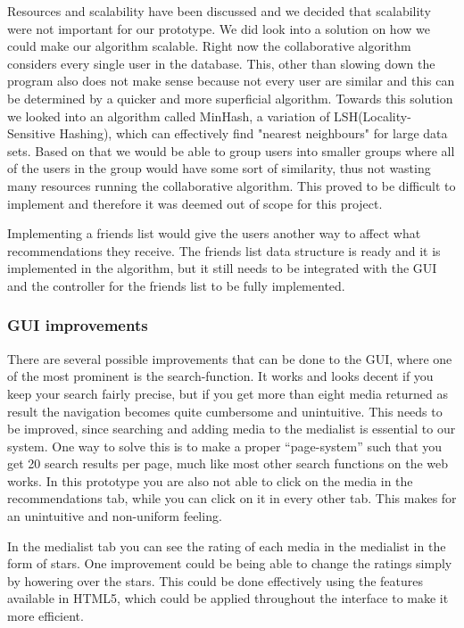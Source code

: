 Resources and scalability have been discussed and we decided that scalability were not important for our prototype. We did look into a solution on how we could make our algorithm scalable. Right now the collaborative algorithm considers every single user in the database. This, other than slowing down the program also does not make sense because not every user are similar and this can be determined by a quicker and more superficial algorithm. Towards this solution we looked into an algorithm called MinHash, a variation of LSH(Locality-Sensitive Hashing), which can effectively find "nearest neighbours" for large data sets. Based on that we would be able to group users into smaller groups where all of the users in the group would have some sort of similarity, thus not wasting many resources running the collaborative algorithm. This proved to be difficult to implement and therefore it was deemed out of scope for this project.

Implementing a friends list would give the users another way to affect what recommendations they receive. The friends list data structure is ready and it is implemented in the algorithm, but it still needs to be integrated with the GUI and the controller for the friends list to be fully implemented.

\subsubsection{GUI improvements}
There are several possible improvements that can be done to the GUI, where one of the most prominent is the search-function. It works and looks decent if you keep your search fairly precise, but if you get more than eight media returned as result the navigation becomes quite cumbersome and unintuitive. This needs to be improved, since searching and adding media to the medialist is essential to our system. One way to solve this is to make a proper “page-system” such that you get 20 search results per page, much like most other search functions on the web works.
In this prototype you are also not able to click on the media in the recommendations tab, while you can click on it in every other tab. This makes for an unintuitive and non-uniform feeling.

In the medialist tab you can see the rating of each media in the medialist in the form of stars. One improvement could be being able to change the ratings simply by howering over the stars. This could be done effectively using the features available in HTML5, which could be applied throughout the interface to make it more efficient.

